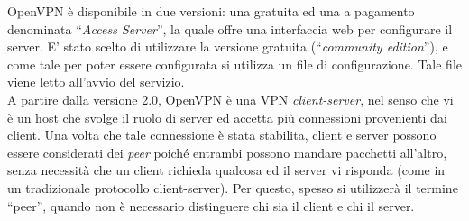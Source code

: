 OpenVPN è disponibile in due versioni: una gratuita ed una a pagamento denominata
``\textit{Access Server}'', la quale offre una interfaccia web per configurare il server.
E' stato scelto di utilizzare la versione gratuita (``\textit{community edition}''),
e come tale per poter essere configurata si utilizza un file di configurazione. Tale file
viene letto all'avvio del servizio.\\
A partire dalla versione 2.0, OpenVPN è una VPN \textit{client-server}, nel senso che
vi è un host che svolge il ruolo di server ed accetta più connessioni provenienti
dai client. Una volta che tale connessione è stata stabilita, client e server
possono essere considerati dei \textit{peer} poiché entrambi possono mandare pacchetti
all'altro, senza necessità che un client richieda qualcosa ed il server vi risponda
(come in un tradizionale protocollo client-server). Per questo, spesso si utilizzerà
il termine ``peer'', quando non è necessario distinguere chi sia il client e chi
il server.



